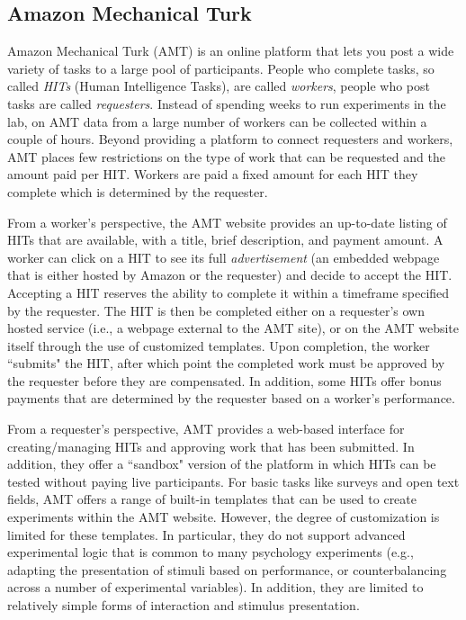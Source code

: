 \documentclass[twocolumn]{svjour3}          %
\begin{document}
\subsection{Amazon Mechanical Turk} 

Amazon Mechanical Turk (AMT) is an online platform that lets you post a wide variety of tasks to a large pool of participants. People
who complete tasks, so called \emph{HITs} (Human Intelligence Tasks), are called \emph{workers}, people who post tasks are called
\emph{requesters}.
Instead of spending weeks to run experiments in the lab, on AMT data from a large number of workers can be collected within a couple of hours.
Beyond providing a platform to connect requesters and workers, AMT places few restrictions on the type of work that can be requested and the amount paid per HIT.
Workers are paid a fixed amount for each HIT they complete which is determined by the requester.

From a worker's perspective, the AMT website provides an up-to-date listing of HITs that are available, with a title, brief description, and payment amount.
A worker can click on a HIT to see its full \emph{advertisement} (an embedded webpage that is either hosted by
Amazon or the requester) and decide to accept the HIT. 
Accepting a HIT reserves the ability to complete it within a timeframe specified by the requester.
The HIT is then be completed either on a requester's own hosted service (i.e., a webpage external to the AMT site), or on the AMT website itself through the use of customized templates.
Upon completion, the worker ``submits" the HIT, after which point the completed work must be approved by the requester before they are compensated.
In addition, some HITs offer bonus payments that are determined by the requester based on a worker's performance.

From a requester's perspective, AMT provides a web-based interface for creating/managing HITs and approving work that has been submitted.
In addition, they offer a ``sandbox" version of the platform in which HITs can be tested without paying live participants.
For basic tasks like surveys and open text fields, AMT offers a range of built-in templates that can be used to create experiments within the AMT website.
However, the degree of customization is limited for these templates. 
In particular, they do not support advanced experimental logic that is common to many psychology experiments (e.g., adapting the presentation of stimuli based on performance, or counterbalancing across a number of experimental variables).
In addition, they are limited to relatively simple forms of interaction and stimulus presentation.
\end{document}
